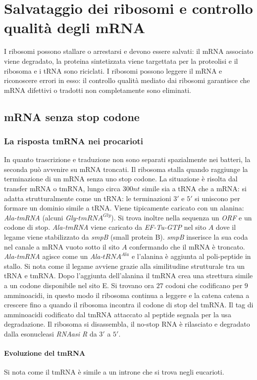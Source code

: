 \section{Salvataggio dei ribosomi e controllo qualit\`a degli mRNA}
I ribosomi possono stallare o arrestarsi e devono essere salvati: il mRNA associato viene degradato, la proteina sintetizzata viene targettata per la proteolisi e il ribosoma e i 
tRNA sono riciclati. I ribosomi possono leggere il mRNA e riconoscere errori in esso: il controllo qualit\`a mediato dai ribosomi garantisce che mRNA difettivi o tradotti non 
completamente sono eliminati. 
\subsection{mRNA senza stop codone}
\subsubsection{La risposta tmRNA nei procarioti}
In quanto trascrizione e traduzione non sono separati spazialmente nei batteri, la seconda pu\`o avvenire su mRNA troncati. Il ribosoma stalla quando raggiunge la terminazione di un 
mRNA senza uno stop codone. La situazione \`e risolta dal transfer mRNA o tmRNA, lungo circa $300nt$ simile sia a tRNA che a mRNA: si adatta strutturalmente come un tRNA: le terminazioni
$3'$ e $5'$ si uniscono per formare un dominio simile a tRNA. Viene tipicamente caricato con un alanina: \emph{Ala-tmRNA} (alcuni \emph{Gly-$tmRNA^{Gly}$}). Si trova inoltre nella
sequenza un \emph{ORF} e un codone di stop. \emph{Ala-tmRNA} viene caricato da \emph{EF-Tu-GTP} nel sito $A$ dove il legame viene stabilizzato da \emph{smpB} (small protein B). 
\emph{smpB} inserisce la sua coda nel canale a mRNA vuoto sotto il sito $A$ confermando che il mRNA \`e troncato. \emph{Ala-tmRNA} agisce come un \emph{Ala-$tRNA^{Ala}$} e l'alanina \`e 
aggiunta al poli-peptide in stallo. Si nota come il legame avviene grazie alla similitudine strutturale tra un tRNA e tmRNA. Dopo l'aggiunta dell'alanina il tmRNA crea una strettura 
simile a un codone disponibile nel sito E. Si trovano ora $27$ codoni che codificano per $9$ amminoacidi, in questo modo il ribosoma continua a leggere e la catena catena a crescere fino
a quando il ribosoma incontra il codone di stop del tmRNA. Il tag di amminoacidi codificato dal tmRNA attaccato al peptide segnala per la usa degradazione. Il ribosoma si disassembla, 
il no-stop RNA \`e rilasciato e degradato dalla esonucleasi \emph{RNAasi R} da $3'$ a $5'$. 
\paragraph{Evoluzione del tmRNA} 
Si nota come il tmRNA \`e simile a un introne che si trova negli eucarioti. 
